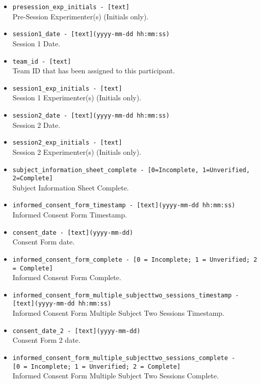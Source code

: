 \begin{description}
\begin{addmargin}[0em]{0em}
\begin{addmargin}[1em]{0em}
\begin{itemize}
            \item \verb|presession_exp_initials - [text]|\\Pre-Session Experimenter(s) (Initials only).
            \item \verb|session1_date - [text](yyyy-mm-dd hh:mm:ss)|\\Session 1 Date.
            \item \verb|team_id - [text]|\\Team ID that has been assigned to this participant.
            \item \verb|session1_exp_initials - [text]|\\Session 1 Experimenter(s) (Initials only).
            \item \verb|session2_date - [text](yyyy-mm-dd hh:mm:ss)|\\Session 2 Date.
            \item \verb|session2_exp_initials - [text]|\\Session 2 Experimenter(s) (Initials only).
            \item \verb|subject_information_sheet_complete - [0=Incomplete, 1=Unverified, 2=Complete]|\\Subject Information Sheet Complete.
            \item \verb|informed_consent_form_timestamp - [text](yyyy-mm-dd hh:mm:ss)|\\Informed Consent Form Timestamp.
            \item \verb|consent_date - [text](yyyy-mm-dd)|\\Consent Form date.
            \item \verb|informed_consent_form_complete - [0 = Incomplete; 1 = Unverified; 2 = Complete]|\\Informed Consent Form Complete.
            \item \verb|informed_consent_form_multiple_subjecttwo_sessions_timestamp -|\\\verb|[text](yyyy-mm-dd hh:mm:ss)|\\Informed Consent Form Multiple Subject Two Sessions Timestamp.
            \item \verb|consent_date_2 - [text](yyyy-mm-dd)|\\Consent Form 2 date.
            \item \verb|informed_consent_form_multiple_subjecttwo_sessions_complete -|\\\verb|[0 = Incomplete; 1 = Unverified; 2 = Complete]|\\Informed Consent Form Multiple Subject Two Sessions Complete.\\


\end{itemize}
\end{addmargin}
\end{addmargin}
\end{description}
